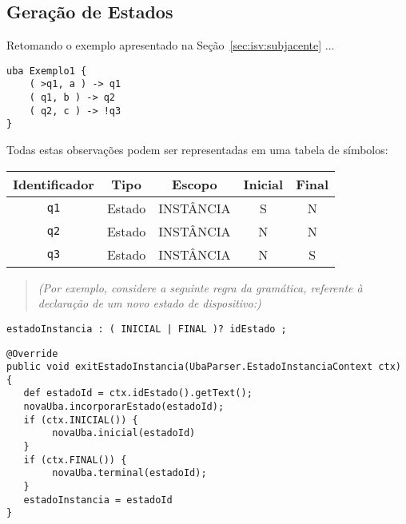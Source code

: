 \subsection{Geração de Estados}
\label{sec:isv:geracao-estados}

Retomando o exemplo apresentado na Seção~\ref{sec:isv:subjacente} ...

\begin{lstlisting}
uba Exemplo1 {
	( >q1, a ) -> q1
	( q1, b ) -> q2
	( q2, c ) -> !q3
}
\end{lstlisting}

Todas estas observações podem ser representadas em uma tabela de símbolos:

\begin{center}\begin{tabular}{c c c c c}
Identificador   & Tipo  & Escopo    & Inicial & Final \\
\hline
\lstinline|q1|	& Estado & INSTÂNCIA  & S & N \\
\lstinline|q2|	& Estado & INSTÂNCIA  & N & N \\
\lstinline|q3|	& Estado & INSTÂNCIA  & N & S \\
\end{tabular}\end{center}

\begin{quote}\textit{(Por exemplo, considere a seguinte regra da gramática, referente à declaração de um novo estado de dispositivo:)}\end{quote}

\begin{lstlisting}[style=antlr]
estadoInstancia : ( INICIAL | FINAL )? idEstado ;
\end{lstlisting}

\begin{lstlisting}
@Override
public void exitEstadoInstancia(UbaParser.EstadoInstanciaContext ctx) {
   def estadoId = ctx.idEstado().getText();
   novaUba.incorporarEstado(estadoId);
   if (ctx.INICIAL()) {
        novaUba.inicial(estadoId)
   }
   if (ctx.FINAL()) {
        novaUba.terminal(estadoId);
   }
   estadoInstancia = estadoId
}
\end{lstlisting}

